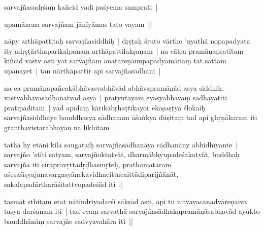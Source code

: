 \documentclass[article,12pt,a4paper]{memoir}%
\newcounter{parCount}
\begin{document}
	  \pstart \leavevmode%
	sarvajñasadṛśaṃ kañcid yadi paśyema samprati | 
	{}
	\pend%
      

	  \pstart \leavevmode%
	upamānena sarvajñaṃ jānīyāmas tato vayam || 
	{}
	\pend%
      

	  \pstart \leavevmode%
	\label{thakur75-30.24}nāpy arthāpattitaḥ sarvajñasiddhiḥ | dṛṣṭaḥ śruto vārtho 'nyathā nopapadyata ity adṛṣṭārthaparikalpanam arthāpattilakṣaṇam | na cātra pramāṇapratītaṃ kiñcid vastv asti yat sarvajñam anatareṇānupapadyamānaṃ tat sattām upanayet | tan nārthāpattir api sarvajñasādhanī | 
	{}
	\pend%
      

	  \pstart \leavevmode%
	\label{thakur75-30.27}na ca pramāṇapañcakābhāvasvabhāvād abhāvapramāṇād asya siddhiḥ, vastvabhāvasādha\leavevmode{}\label{RNAms_17a}natvād asya | pratyutāyam evāsyābhāvaṃ sādhayatīti pratipāditam | yad apīdaṃ kārikābṛhaṭtīkayor ekaṣaṣṭyā ślokaiḥ sarvajñasiddhaye bauddhasya sādhanam āśaṅkya dūṣitaṃ tad api ghṛṇākaram iti granthavistarabhayān na likhitam |
	{}
	\pend%
      

	  \pstart \leavevmode%
	\label{thakur75-31.1}tathā hy etāni kila saugataiḥ sarvajñasādhanāya sādhanāny abhidhīyante | sarvajño 'stīti satyam, sarvajñoktatvāt, dharmābhyupadeśakatvāt, buddhaḥ sarvajña iti cirapravṛttadṛḍhasmṛteḥ, prathamataram aśeṣaśiṣyajanavargasyānekavidhacittacaittādiparijñānāt, sakalapadārtharāśitattvopadeśād iti || 
	{}
	\pend%
      

	  \pstart \leavevmode%
	\label{thakur75-31.6}tasmāt sthitam etat nātīndriyadarśī sākṣād asti, api tu nityavacanadvāreṇaiva tasya darśanam iti | tad evaṃ sarvathā sarvajñasādhakapramāṇāsabhavād ayukto bauddhānāṃ sarvajñe sadvyavahāra iti || 
	{}
	\pend%
      
\end{document}
